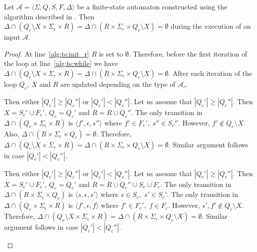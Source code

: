 \begin{proposition}\label{prop:thompson_sep_6}
  Let $\mathcal{A} = \langle \Sigma, Q, S, F, \Delta \rangle$ be a finite-state
  automaton constructed using the algorithm described in . Then
  $\Delta \cap (Q_c \setminus X \times \Sigma_\epsilon \times R) = \Delta \cap (R
  \times \Sigma_\epsilon \times Q_c \setminus X) = \emptyset$ during the execution of
   on input $\mathcal{A}$.
\end{proposition}

\begin{proof}
  At line~\ref{alg:ts:init_r} $R$ is set to $\emptyset$. Therefore, before the first iteration
  of the loop at line~\ref{alg:ts:while} we have $\Delta \cap (Q_c \setminus X \times
    \Sigma_\epsilon \times R) = \Delta \cap (R \times \Sigma_\epsilon \times Q_c
    \setminus X) = \emptyset$. After each iteration of the loop $Q_c$, $X$ and
  $R$ are updated depending on the type of $\mathcal{A}_c$.

  \begin{case}
    Then either $|Q_c'| \geq |Q_c''|$ or $|Q_c'| < |Q_c''|$. Let us
    assume that $|Q_c'| \geq |Q_c''|$. Then $X = S_c' \cup F_c'$, $Q_c =
      Q_c'$ and $R = R \cup Q_c''$. The only transition in $\Delta \cap
      (Q_c \times \Sigma_\epsilon \times R)$ is $\langle f',
      \epsilon, s'' \rangle$ where $f' \in F_c', \; s'' \in S_c''$.
    However, $f' \not\in Q_c \setminus X$. Also, $\Delta \cap (R \times
      \Sigma_\epsilon \times Q_c) = \emptyset$. Therefore,
    $\Delta \cap (Q_c \setminus X \times \Sigma_\epsilon \times R) =
      \Delta \cap (R \times \Sigma_\epsilon \times Q_c \setminus X) =
      \emptyset$. Similar argument follows in case $|Q_c'| < |Q_c''|$.
  \end{case}

  \begin{case}
    Then either $|Q_c'| \geq |Q_c''|$ or $|Q_c'| < |Q_c''|$. Let us
    assume that $|Q_c'| \geq |Q_c''|$. Then $X = S_c' \cup F_c'$, $Q_c =
      Q_c'$ and $R = R \cup Q_c'' \cup S_c \cup F_c$. The only transition
    in $\Delta \cap (R \times \Sigma_\epsilon \times Q_c)$ is $\langle
      s, \epsilon, s' \rangle$ where $s \in S_c, \; s' \in S_c'$. The only
    transition in $\Delta \cap (Q_c \times \Sigma_\epsilon \times R)$ is
    $\langle f', \epsilon, f \rangle$ where $f' \in F_c', \; f \in F_c$.
    However, $s', f' \not\in Q_c \setminus X$. Therefore, $\Delta \cap
      (Q_c \setminus X \times \Sigma_\epsilon \times R) = \Delta \cap (R
      \times \Sigma_\epsilon \times Q_c \setminus X) = \emptyset$.
    Similar argument follows in case $|Q_c'| < |Q_c''|$.
  \end{case}


\end{proof}
